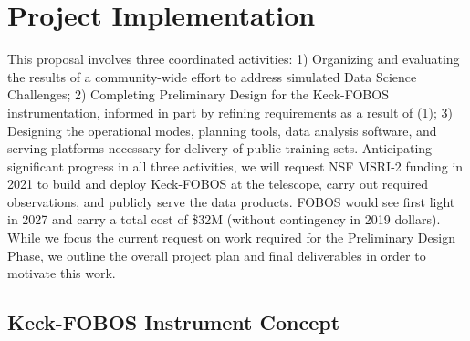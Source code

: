 \documentclass[oneside,11pt]{amsart}
\newcommand{\comment}[2][todo]{{\color{#1}[[{\bf #2}]]}}
\begin{document}






\section{Project Implementation}
\label{sec:project}

This proposal involves three coordinated activities: 1) Organizing and evaluating the results of a community-wide
effort to address simulated Data Science Challenges; 2) Completing Preliminary Design for the Keck-FOBOS
instrumentation, informed in part by refining requirements as a result of (1); 3) Designing the operational modes,
planning tools, data analysis software, and serving platforms necessary for delivery of public training sets.
Anticipating significant progress in all three activities, we will request NSF MSRI-2 funding in 2021 to build and
deploy Keck-FOBOS at the telescope, carry out required observations, and publicly serve the data products.  FOBOS would
see first light in 2027 and carry a total cost of \$32M (without contingency in 2019 dollars).  While we focus the
current request on work required for the Preliminary Design Phase, we outline the overall project plan and final
deliverables in order to motivate this work.

\subsection{Keck-FOBOS Instrument Concept}
\label{sec:concept}
\end{document}
